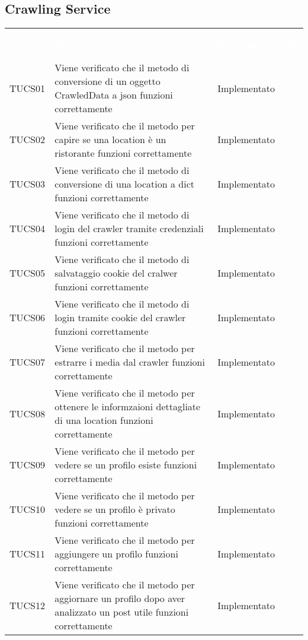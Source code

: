 \subsection{Crawling Service}
\renewcommand{\arraystretch}{1.5}
\begin{longtable}{ m{}<{\centering}  m{}<{\centering}  m{}<{\centering} }
	\rowcolor{darkblue}
	\textcolor{white}{\textbf{ID Test}} &\textcolor{white}{\textbf{Descrizione}} & \textcolor{white}{\textbf{Implementazione}} \\ 

	TUCS01 & Viene verificato che il metodo di conversione di un oggetto CrawledData a json funzioni correttamente & Implementato \\
    TUCS02 & Viene verificato che il metodo per capire se una location è un ristorante funzioni correttamente  & Implementato \\
    TUCS03 & Viene verificato che il metodo di conversione di una location a dict funzioni correttamente & Implementato \\
    TUCS04 & Viene verificato che il metodo di login del crawler tramite credenziali funzioni correttamente & Implementato \\
    TUCS05 & Viene verificato che il metodo di salvataggio cookie del cralwer funzioni correttamente & Implementato \\
    TUCS06 & Viene verificato che il metodo di login tramite cookie del crawler funzioni correttamente & Implementato \\
    TUCS07 & Viene verificato che il metodo per estrarre i media dal crawler funzioni correttamente & Implementato \\
    TUCS08 & Viene verificato che il metodo per ottenere le informzaioni dettagliate di una location funzioni correttamente & Implementato \\
    TUCS09 & Viene verificato che il metodo per vedere se un profilo esiste funzioni correttamente & Implementato \\
    TUCS10 & Viene verificato che il metodo per vedere se un profilo è privato funzioni correttamente & Implementato \\
    TUCS11 & Viene verificato che il metodo per aggiungere un profilo funzioni correttamente & Implementato \\
    TUCS12 & Viene verificato che il metodo per aggiornare un profilo dopo aver analizzato un post utile funzioni correttamente & Implementato \\

\end{longtable}
